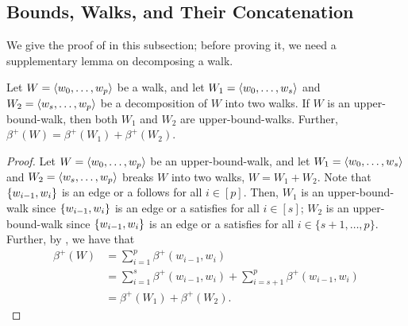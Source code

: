 \documentclass[runningheads]{llncs}
\begin{document}
\subsection{Bounds, Walks, and Their Concatenation}

We give the proof of  in this subsection; before proving it, we need a supplementary lemma on decomposing a walk. 
\begin{lemma}\label{remark: decompose cycle}
Let $W=\langle w_0,\dots, w_p\rangle$ be a walk, and let $W_1 = \langle w_0, \dots, w_s\rangle$ and $W_2 = \langle w_s, \dots, w_p\rangle$ be a decomposition of $W$ into two walks. 
If $W$ is an upper-bound-walk, then both $W_1$ and $W_2$ are upper-bound-walks. 
Further, $\beta^+(W) = \beta^+(W_1)+\beta^+(W_2)$. 
\end{lemma}
\begin{proof}
Let $W=\langle w_0,\dots, w_p\rangle$ be an upper-bound-walk, and let $W_1 = \langle w_0, \dots, w_s\rangle$ and $W_2 = \langle w_s, \dots, w_p\rangle$ breaks $W$ into two walks, $W=W_1 + W_2$. Note that $\{w_{i-1}, w_i\}$ is an edge or a \nedge{} follows  for all $i\in[p]$.
Then, $W_1$ is an upper-bound-walk since $\{w_{i-1}, w_i\}$ is an edge or a \nedge{} satisfies  for all $i\in[s]$; $W_2$ is an upper-bound-walk since $\{w_{i-1}, w_i\}$ is an edge or a \nedge{} satisfies  for all $i\in\{s+1, \dots, p\}$.
Further, by , we have that 
\begin{equation}\begin{split}
       \beta^+(W) 
&= \sum^{p}_{i=1} \beta^+(w_{i-1}, w_i) \\
&= \sum^{s}_{i=1} \beta^+(w_{i-1}, w_i) + \sum^{p}_{i=s+1} \beta^+(w_{i-1}, w_i) \\
&= \beta^+(W_1)+\beta^+(W_2).  
\end{split}\end{equation}
\end{proof}

\end{document}
